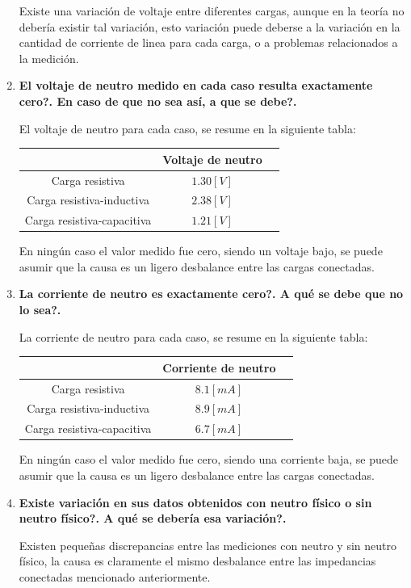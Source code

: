 \documentclass[letter,11pt]{article}
\begin{document}
\begin{enumerate}
Existe una variación de voltaje entre diferentes cargas, aunque en la teoría no
debería existir tal variación, esto variación puede deberse a la variación en la
cantidad de corriente de linea para cada carga, o a problemas relacionados a la
medición.

\item \textbf{El voltaje de neutro medido en cada caso resulta exactamente
cero?. En caso de que no sea así, a que se debe?.}

El voltaje de neutro para cada caso, se resume en la siguiente tabla:
\begin{center}
    \begin{tabular}{|c||c|c||}
    \hline
    & \textbf{Voltaje de neutro}
    \tabularnewline \hline \hline
    Carga resistiva & $1.30[V]$
    \tabularnewline \hline
    Carga resistiva-inductiva & $2.38[V]$
    \tabularnewline \hline
    Carga resistiva-capacitiva & $1.21[V]$
    \tabularnewline \hline
    \end{tabular}
\end{center}

En ningún caso el valor medido fue cero, siendo un voltaje bajo, se puede asumir
que la causa es un ligero desbalance entre las cargas conectadas.

\item \textbf{La corriente de neutro es exactamente cero?. A qué se debe que no
lo sea?.}

La corriente de neutro para cada caso, se resume en la siguiente tabla:
\begin{center}
    \begin{tabular}{|c||c|c||}
    \hline
    & \textbf{Corriente de neutro}
    \tabularnewline \hline \hline
    Carga resistiva & $8.1[mA]$
    \tabularnewline \hline
    Carga resistiva-inductiva & $8.9[mA]$
    \tabularnewline \hline
    Carga resistiva-capacitiva & $6.7[mA]$
    \tabularnewline \hline
    \end{tabular}
\end{center}

En ningún caso el valor medido fue cero, siendo una corriente baja, se puede
asumir que la causa es un ligero desbalance entre las cargas conectadas.

\item \textbf{Existe variación en sus datos obtenidos con neutro físico o sin
neutro físico?. A qué se debería esa variación?.}

Existen pequeñas discrepancias entre las mediciones con neutro y sin neutro
físico, la causa es claramente el mismo desbalance entre las impedancias
conectadas mencionado anteriormente.


\end{enumerate}
\end{document}
